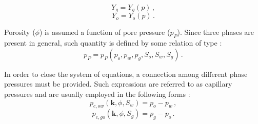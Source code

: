 \documentclass[authoryear,preprint,review,12pt]{elsarticle}
\begin{document}
\begin{equation}
Y_g = Y_g (p) \, ,
\end{equation}
\begin{equation}
Y_o = Y_o (p) \, .
\end{equation}

Porosity ($\phi$) is assumed a function of pore pressure ($p_P$). Since three phases are present in general, such quantity is defined by some relation of type \citep{kim2011rigorous}:
\begin{equation}
p_P=p_P\left(p_o,p_w,p_g,S_o,S_w,S_g\right) \, .
\end{equation}

In order to close the system of equations, a connection among different phase pressures must be provided. Such expressions are referred to as capillary pressures and are usually employed in the following forms \citep{aziz1979petroleum}:
\begin{equation}\label{eq: capillary_ow}
p_{c,ow}\left(\mathbf{k},\phi,S_w\right)=p_o-p_w \, ,
\end{equation}
\begin{equation}\label{eq: capillary_og}
p_{c,go}\left(\mathbf{k},\phi,S_g\right)=p_g-p_o \, .
\end{equation}



%
%
%
\end{document}
